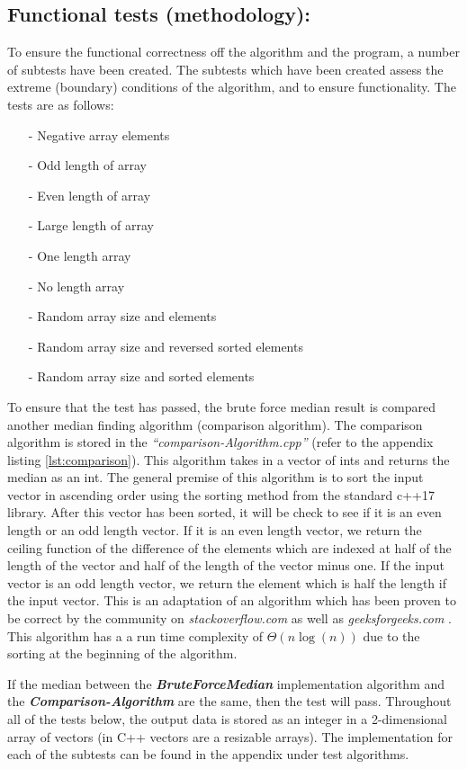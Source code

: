 \documentclass[12pt]{article}
\begin{document}
\subsection{Functional tests (methodology):}
To ensure the functional correctness off the algorithm and the program, a number of subtests have been created. The subtests which have been created assess the extreme (boundary) conditions of the algorithm, and to ensure functionality. The tests are as follows:
\begin{itemize}
	\item[-]Negative array elements
	\item[-]Odd length of array
	\item[-]Even length of array
	\item[-]Large length of array	
	\item[-]One length array
	\item[-]No length array
	\item[-]Random array size and elements
	\item[-]Random array size and reversed sorted elements
	\item[-]Random array size and sorted elements
\end{itemize}
To ensure that the test has passed, the brute force median result is compared another median finding algorithm (comparison algorithm). The comparison algorithm is stored in the \textit{“comparison-Algorithm.cpp”} (refer to the appendix listing \ref{lst:comparison}). This algorithm takes in a vector of ints and returns the median as an int.  The general premise of this algorithm is to sort the input vector in ascending order using the sorting method from the standard c++17 library. After this vector has been sorted, it will be check to see if it is an even length or an odd length vector. If it is an even length vector, we return the ceiling function of the difference of the elements which are indexed at half of the length of the vector and half of the length of the vector minus one. If the input vector is  an odd length vector, we return the element which is half the length if the input vector. This is an adaptation of an algorithm which has been proven to be correct by the community on \textit{stackoverflow.com} as well as \textit{geeksforgeeks.com}\cite{RN2} \cite{RN3}. This algorithm has a a run time complexity of $\Theta (n\log(n))$ due to the sorting at the beginning of the algorithm.

If the median between the \textbf{\textit{BruteForceMedian}} implementation algorithm and the \textbf{\textit{Comparison-Algorithm}} are the same, then the test will pass. Throughout all of the tests below, the output data is stored as an integer in a 2-dimensional array of vectors (in C++ vectors are a resizable arrays). The implementation for each of the subtests can be found in the appendix under test algorithms. 
\end{document}
